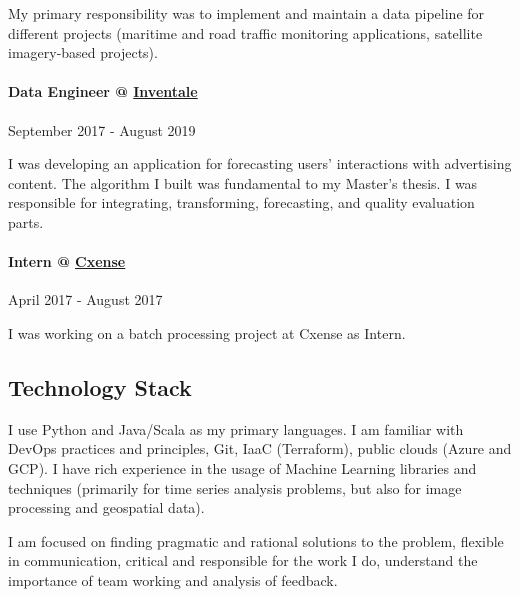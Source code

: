 \documentclass[11pt]{article}
\begin{document}
My primary responsibility was to implement and maintain a data pipeline for
different projects (maritime and road traffic monitoring applications,
satellite imagery-based projects).

\paragraph*{Data Engineer @ \href{https://inventale.com/en/Inventale}{Inventale}} September 2017 - August 2019

I was developing an application for forecasting users' interactions with
advertising content. The algorithm I built was fundamental to my Master's thesis.
I was responsible for integrating, transforming, forecasting, and quality evaluation parts.

\paragraph*{Intern @ \href{https://resources.piano.io/articles/piano-acquires-cxense-expanding-the-possibilities-of-the-platform-with-data-management-and-intelligent-personalization-capabilities}{Cxense}} April 2017 - August 2017

I was working on a batch processing project at Cxense as Intern.

\subsection*{Technology Stack}

I use Python and Java/Scala as my primary languages. I am familiar with
DevOps practices and principles, Git, IaaC (Terraform),
public clouds (Azure and GCP). I have rich experience in the usage of Machine Learning
libraries and techniques (primarily for time series analysis problems, but
also for image processing and geospatial data).

I am focused on finding pragmatic and rational solutions to the problem,
flexible in communication, critical and responsible for the work I do,
understand the importance of team working and analysis of feedback.
\end{document}
